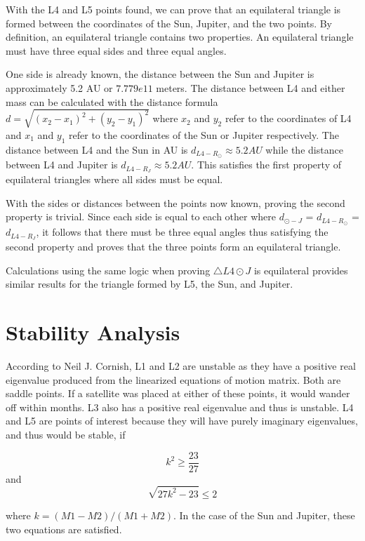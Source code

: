 \documentclass[linenumbers,RNAAS,trackchanges]{aastex631}
\begin{document}
With the L4 and L5 points found, we can prove that an equilateral triangle is formed between the coordinates of the Sun, Jupiter, and the two points. By definition, an equilateral triangle contains two properties. An equilateral triangle must have three equal sides and three equal angles. 

One side is already known, the distance between the Sun and Jupiter is approximately 5.2 AU or $7.779e11$ meters. The distance between L4 and either mass can be calculated with the distance formula $d = \sqrt{(x_2 - x_1 )^2 + (y_2 - y_1) ^ 2}$ where $x_2$ and $y_2$ refer to the coordinates of L4 and $x_1$ and $y_1$ refer to the coordinates of the Sun or Jupiter respectively. The distance between L4 and the Sun in AU is $d_{L4-R_\odot} \approx 5.2 AU$ while the distance between L4 and Jupiter is $d_{L4-R_{J}} \approx 5.2AU$. This satisfies the first property of equilateral triangles where all sides must be equal. 

With the sides or distances between the points now known, proving the second property is trivial. Since each side is equal to each other where $d_{{\odot}-{J}}$ = $d_{L4-R_\odot}$ = $d_{L4-R_{J}}$, it follows that there must be three equal angles thus satisfying the second property and proves that the three points form an equilateral triangle. 

Calculations using the same logic when proving $\triangle {L4}{\odot}{J}$ is equilateral provides similar results for the triangle formed by L5, the Sun, and Jupiter. 

\newpage
\section{Stability Analysis} \label{sec:Stability analysis}
According to Neil J. Cornish, L1 and L2 are unstable as they have a positive real eigenvalue produced from the linearized equations of motion matrix. Both are saddle points. If a satellite was placed at either of these points, it would wander off within months. L3 also has a positive real eigenvalue and thus is unstable. L4 and L5 are points of interest because they will have purely imaginary eigenvalues, and thus would be stable, if

$$k^2 \geq \frac{23}{27}$$ and $$\sqrt{27k^2 - 23} \leq 2$$

where $k = (M1 - M2) / (M1 + M2)$. In the case of the Sun and Jupiter, these two equations are satisfied.\cite{cornish_1998}
\end{document}
